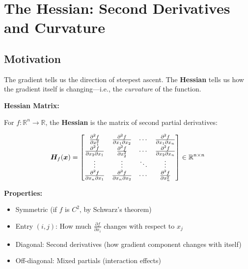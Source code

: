 \section{The Hessian: Second Derivatives and Curvature}

\subsection{Motivation}

The gradient tells us the direction of steepest ascent. The \textbf{Hessian} tells us how the gradient itself is changing---i.e., the \textit{curvature} of the function.

\begin{seanbox}{6.4}
\textbf{Hessian Matrix:}

For $f: \mathbb{R}^n \to \mathbb{R}$, the \textbf{Hessian} is the matrix of second partial derivatives:

\begin{equation}
    \bm{H}_f(\bm{x}) = \begin{bmatrix}
        \frac{\partial^2 f}{\partial x_1^2} & \frac{\partial^2 f}{\partial x_1 \partial x_2} & \cdots & \frac{\partial^2 f}{\partial x_1 \partial x_n} \\
        \frac{\partial^2 f}{\partial x_2 \partial x_1} & \frac{\partial^2 f}{\partial x_2^2} & \cdots & \frac{\partial^2 f}{\partial x_2 \partial x_n} \\
        \vdots & \vdots & \ddots & \vdots \\
        \frac{\partial^2 f}{\partial x_n \partial x_1} & \frac{\partial^2 f}{\partial x_n \partial x_2} & \cdots & \frac{\partial^2 f}{\partial x_n^2}
    \end{bmatrix} \in \mathbb{R}^{n \times n}
\end{equation}

\textbf{Properties:}
\begin{itemize}
    \item Symmetric (if $f$ is $C^2$, by Schwarz's theorem)
    \item Entry $(i,j)$: How much $\frac{\partial f}{\partial x_i}$ changes with respect to $x_j$
    \item Diagonal: Second derivatives (how gradient component changes with itself)
    \item Off-diagonal: Mixed partials (interaction effects)
\end{itemize}
\end{seanbox}

